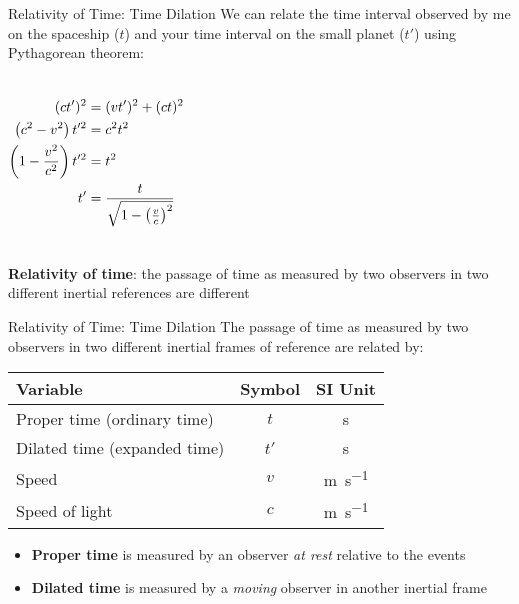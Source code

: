 \documentclass[12pt,compress,aspectratio=169]{beamer}
\newcommand{\bigsqrt}{\ensuremath\sqrt{1-\left(\frac{v}{c}\right)^2}}
\newcommand{\eq}[2]{\vspace{#1}{\Large\begin{displaymath}#2\end{displaymath}}}
\begin{document}
\begin{frame}{Relativity of Time: Time Dilation}
  We can relate the time interval observed by me on the spaceship ($t$) and
  your time interval on the small planet ($t'$) using Pythagorean theorem:
  \begin{columns}
    
    \begin{align*}
      (ct')^2 &=(vt')^2 + (ct)^2\\
      \left(c^2-v^2\right)t'^2 &=c^2t^2\\
      \left(1-\frac{v^2}{c^2}\right)t'^2 &=t^2\\
      t' &=\frac{t}{\bigsqrt}
    \end{align*}
  \end{columns}
  \vspace{.1in}\textbf{Relativity of time}: the passage of time as measured by
  two observers in two different inertial references are different
\end{frame}



\begin{frame}{Relativity of Time: Time Dilation}
  The passage of time as measured by two observers in two different inertial
  frames of reference are related by:
  
  \eq{-.2in}{
    \boxed{t' =\frac{t}{\bigsqrt}}
  }
  \begin{center}
    \begin{tabular}{l|c|c}
      \rowcolor{pink}
      \textbf{Variable} & \textbf{Symbol} & \textbf{SI Unit}\\ \hline
      Proper time (ordinary time)  & $t$  & \si{\second} \\
      Dilated time (expanded time) & $t'$ & \si{\second} \\
      Speed           & $v$ & \si{\metre\per\second}\\
      Speed of light  & $c$ & \si{\metre\per\second}
    \end{tabular}
  \end{center}
  \begin{itemize}    
  \item\textbf{Proper time} is measured by an observer \emph{at rest} relative
    to the events
  \item\textbf{Dilated time} is measured by a \emph{moving} observer in another
    inertial frame
  \end{itemize}
\end{frame}
\end{document}
